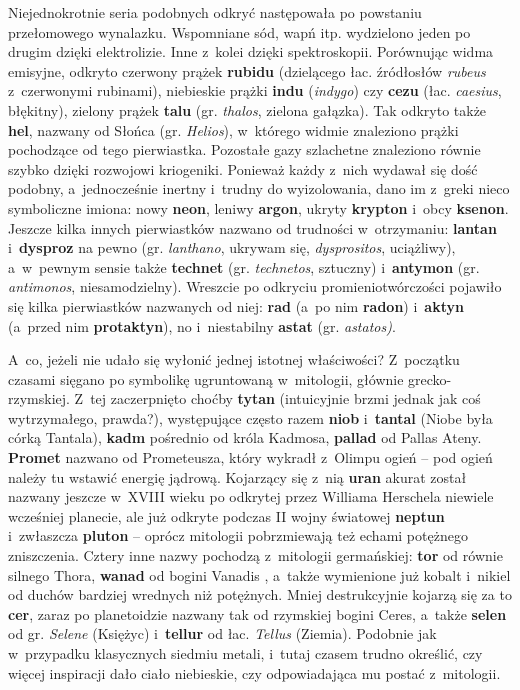 \begin{dwieszpalty}

Niejednokrotnie seria podobnych odkryć następowała po powstaniu
przełomowego wynalazku. Wspomniane sód, wapń itp. wydzielono jeden po
drugim dzięki elektrolizie. Inne z~kolei dzięki spektroskopii.
Porównując widma emisyjne, odkryto czerwony prążek \textbf{rubidu}
(dzielącego łac. źródłosłów \emph{rubeus} z~czerwonymi rubinami),
niebieskie prążki \textbf{indu} (\emph{indygo}) czy \textbf{cezu} (łac.
\emph{caesius}, błękitny), zielony prążek \textbf{talu} (gr.
\emph{thalos}, zielona gałązka). Tak odkryto także \textbf{hel}, nazwany
od Słońca (gr. \emph{Helios}), w~którego widmie znaleziono prążki
pochodzące od tego pierwiastka. Pozostałe gazy szlachetne znaleziono
równie szybko dzięki rozwojowi kriogeniki. Ponieważ każdy z~nich wydawał
się dość podobny, a~jednocześnie inertny i~trudny do wyizolowania, dano
im z~greki nieco symboliczne imiona: nowy \textbf{neon}, leniwy
\textbf{argon}, ukryty \textbf{krypton} i~obcy \textbf{ksenon}. Jeszcze
kilka innych pierwiastków nazwano od trudności w~otrzymaniu:
\textbf{lantan} i~\textbf{dysproz} na pewno (gr. \emph{lanthano},
ukrywam się, \emph{dysprositos}, uciążliwy), a~w~pewnym sensie także
\textbf{technet} (gr. \emph{technetos}, sztuczny) i~\textbf{antymon}
(gr. \emph{antimonos}, niesamodzielny). Wreszcie po odkryciu
promieniotwórczości pojawiło się kilka pierwiastków nazwanych od niej:
\textbf{rad} (a~po nim \textbf{radon}) i~\textbf{aktyn} (a~przed nim
\textbf{protaktyn}), no i~niestabilny \textbf{astat} (gr.
\emph{astatos)}.


A~co, jeżeli nie udało się wyłonić jednej istotnej właściwości? Z~początku czasami sięgano po symbolikę ugruntowaną w~mitologii, głównie
grecko-rzymskiej. Z~tej zaczerpnięto choćby \textbf{tytan} (intuicyjnie
brzmi jednak jak coś wytrzymałego, prawda?), występujące często razem
\textbf{niob} i~\textbf{tantal} (Niobe była córką Tantala),
\textbf{kadm} pośrednio od króla Kadmosa, \textbf{pallad} od Pallas
Ateny. \textbf{Promet} nazwano od Prometeusza, który wykradł z~Olimpu
ogień -- pod ogień należy tu wstawić energię jądrową. Kojarzący się z~nią \textbf{uran} akurat został nazwany jeszcze w~XVIII wieku po
odkrytej przez Williama Herschela niewiele wcześniej planecie, ale już odkryte
podczas II wojny światowej \textbf{neptun} i~zwłaszcza \textbf{pluton}
-- oprócz mitologii pobrzmiewają też echami potężnego zniszczenia.
Cztery inne nazwy pochodzą z~mitologii germańskiej: \textbf{tor} od
równie silnego Thora, \textbf{wanad} od bogini Vanadis%
, a~także wymienione już kobalt i~nikiel od duchów bardziej
wrednych niż potężnych. Mniej destrukcyjnie kojarzą się za to
\textbf{cer}, zaraz po planetoidzie nazwany tak od rzymskiej bogini
Ceres, a~także \textbf{selen} od gr. \emph{Selene} (Księżyc) i~\textbf{tellur} od łac. \emph{Tellus} (Ziemia). Podobnie jak w~przypadku
klasycznych siedmiu metali, i~tutaj czasem trudno określić, czy
więcej inspiracji dało ciało niebieskie, czy odpowiadająca mu postać z~mitologii.


\end{dwieszpalty}
